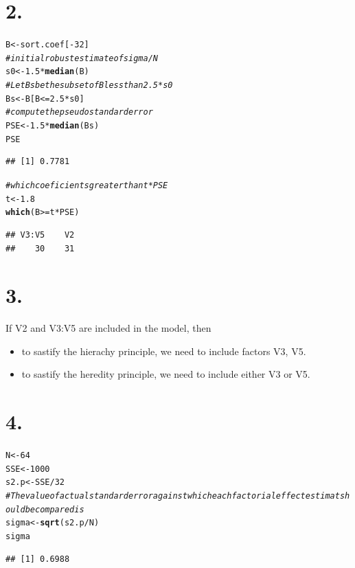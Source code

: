 \documentclass{article}\usepackage[]{graphicx}\usepackage[]{color}
\makeatletter
\newcommand{\hlnum}[1]{\textcolor[rgb]{0.686,0.059,0.569}{#1}}%
\newcommand{\hlcom}[1]{\textcolor[rgb]{0.678,0.584,0.686}{\textit{#1}}}%
\newcommand{\hlopt}[1]{\textcolor[rgb]{0,0,0}{#1}}%
\newcommand{\hlstd}[1]{\textcolor[rgb]{0.345,0.345,0.345}{#1}}%
\newcommand{\hlkwb}[1]{\textcolor[rgb]{0.69,0.353,0.396}{#1}}%
\newcommand{\hlkwd}[1]{\textcolor[rgb]{0.737,0.353,0.396}{\textbf{#1}}}%
\newenvironment{kframe}{%
 \def\at@end@of@kframe{}%
 \ifinner\ifhmode%
  \def\at@end@of@kframe{\end{minipage}}%
  \begin{minipage}{\columnwidth}%
 \fi\fi%
 \def\FrameCommand##1{\hskip\@totalleftmargin \hskip-\fboxsep
 \colorbox{shadecolor}{##1}\hskip-\fboxsep
     \hskip-\linewidth \hskip-\@totalleftmargin \hskip\columnwidth}%
 \MakeFramed {\advance\hsize-\width
   \@totalleftmargin\z@ \linewidth\hsize
   \@setminipage}}%
 {\par\unskip\endMakeFramed%
 \at@end@of@kframe}
\newenvironment{knitrout}{}{} %
\makeatother
\begin{document}
\section*{2.}
\begin{knitrout}
\color{fgcolor}\begin{kframe}
\begin{alltt}
\hlstd{B} \hlkwb{<-} \hlstd{sort.coef[}\hlopt{-}\hlnum{32}\hlstd{]}
\hlcom{# initial robust estimate of sigma/N}
\hlstd{s0} \hlkwb{<-} \hlnum{1.5}\hlopt{*}\hlkwd{median}\hlstd{(B)}
\hlcom{# Let Bs be the subset of B less than 2.5 * s0}
\hlstd{Bs} \hlkwb{<-} \hlstd{B[B}\hlopt{<=}\hlnum{2.5}\hlopt{*}\hlstd{s0]}
\hlcom{# compute the pseudo standard error}
\hlstd{PSE} \hlkwb{<-} \hlnum{1.5} \hlopt{*} \hlkwd{median}\hlstd{(Bs)}
\hlstd{PSE}
\end{alltt}
\begin{verbatim}
## [1] 0.7781
\end{verbatim}
\begin{alltt}
\hlcom{# which coeficients greater  than t*PSE}
\hlstd{t} \hlkwb{<-} \hlnum{1.8}
\hlkwd{which}\hlstd{(B}\hlopt{>=}\hlstd{t}\hlopt{*}\hlstd{PSE)}
\end{alltt}
\begin{verbatim}
## V3:V5    V2 
##    30    31
\end{verbatim}
\end{kframe}
\end{knitrout}

\section*{3.}
If V2 and V3:V5 are included in the model, then 
\begin{itemize}
\item to sastify the hierachy principle,  we need to include factors V3, V5.
\item to sastify the heredity principle, we need to include either V3 or V5.
\end{itemize}
\section*{4.}
\begin{knitrout}
\color{fgcolor}\begin{kframe}
\begin{alltt}
\hlstd{N} \hlkwb{<-} \hlnum{64}
\hlstd{SSE} \hlkwb{<-} \hlnum{1000}
\hlstd{s2.p} \hlkwb{<-} \hlstd{SSE}\hlopt{/}\hlnum{32}
\hlcom{# The value of actual standard error against which each factorial effect estimat should be compared is }
\hlstd{sigma} \hlkwb{<-} \hlkwd{sqrt}\hlstd{(s2.p}\hlopt{/}\hlstd{N)}
\hlstd{sigma}
\end{alltt}
\begin{verbatim}
## [1] 0.6988
\end{verbatim}
\end{kframe}
\end{knitrout}
\end{document}
